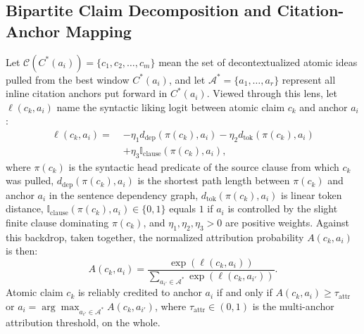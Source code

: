 \documentclass[sigconf]{acmart}
\begin{document}
\subsection{Bipartite Claim Decomposition and Citation-Anchor Mapping}
Let $\mathcal{C}(C^*(a_i)) = \{c_1, c_2, \dots, c_m\}$ mean the set of decontextualized atomic ideas pulled from the best window $C^*(a_i)$, and let $\mathcal{A}^* = \{a_1, \dots, a_r\}$ represent all inline citation anchors put forward in $C^*(a_i)$. Viewed through this lens, let $\ell(c_k, a_i)$ name the syntactic liking logit between atomic claim $c_k$ and anchor $a_i$:
\begin{equation}
\begin{aligned}
\ell(c_k, a_i) = \;& -\eta_1 d_{\text{dep}}(\pi(c_k), a_i) - \eta_2 d_{\text{tok}}(\pi(c_k), a_i) \\
& + \eta_3 \mathbb{I}_{\text{clause}}(\pi(c_k), a_i),
\end{aligned}
\label{eq:bipartite_logit}
\end{equation}
where $\pi(c_k)$ is the syntactic head predicate of the source clause from which $c_k$ was pulled, $d_{\text{dep}}(\pi(c_k), a_i)$ is the shortest path length between $\pi(c_k)$ and anchor $a_i$ in the sentence dependency graph, $d_{\text{tok}}(\pi(c_k), a_i)$ is linear token distance, $\mathbb{I}_{\text{clause}}(\pi(c_k), a_i) \in \{0, 1\}$ equals $1$ if $a_i$ is controlled by the slight finite clause dominating $\pi(c_k)$, and $\eta_1, \eta_2, \eta_3 > 0$ are positive weights. Against this backdrop, taken together, the normalized attribution probability $A(c_k, a_i)$ is then:
\begin{equation}
A(c_k, a_i) = \frac{\exp(\ell(c_k, a_i))}{\sum_{a_{i'} \in \mathcal{A}^*} \exp(\ell(c_k, a_{i'}))}.
\label{eq:bipartite}
\end{equation}
Atomic claim $c_k$ is reliably credited to anchor $a_i$ if and only if $A(c_k, a_i) \geq \tau_{\text{attr}}$ or $a_i = \arg\max_{a_{i'} \in \mathcal{A}^*} A(c_k, a_{i'})$, where $\tau_{\text{attr}} \in (0, 1)$ is the multi-anchor attribution threshold, on the whole.
\end{document}
